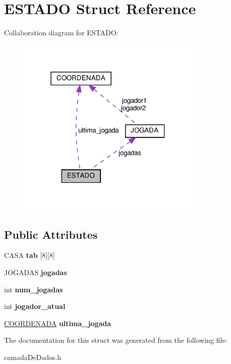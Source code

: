\hypertarget{structESTADO}{}\section{E\+S\+T\+A\+DO Struct Reference}
\label{structESTADO}


Collaboration diagram for E\+S\+T\+A\+DO\+:\nopagebreak
\begin{figure}[H]
\begin{center}
\leavevmode
\includegraphics[width=249pt]{structESTADO__coll__graph}
\end{center}
\end{figure}
\subsection*{Public Attributes}
\begin{DoxyCompactItemize}
\item 
\mbox{\label{structESTADO_ab56f0f1be16954d3768b4174d14c087d}} 
C\+A\+SA {\bfseries tab} \mbox{[}8\mbox{]}\mbox{[}8\mbox{]}
\item 
\mbox{\label{structESTADO_afae43b87a488fad0f2b56a18bad31d18}} 
J\+O\+G\+A\+D\+AS {\bfseries jogadas}
\item 
\mbox{\label{structESTADO_a261495728744647e618b4e623f5a4b7a}} 
int {\bfseries num\+\_\+jogadas}
\item 
\mbox{\label{structESTADO_a5dd28e2e68b7aef2b6b7ea88e02eff58}} 
int {\bfseries jogador\+\_\+atual}
\item 
\mbox{\label{structESTADO_a4896a5c5c1f40b43fb795623327e3f47}} 
\hyperlink{structCOORDENADA}{C\+O\+O\+R\+D\+E\+N\+A\+DA} {\bfseries ultima\+\_\+jogada}
\end{DoxyCompactItemize}


The documentation for this struct was generated from the following file\+:\begin{DoxyCompactItemize}
\item 
camada\+De\+Dados.\+h\end{DoxyCompactItemize}
